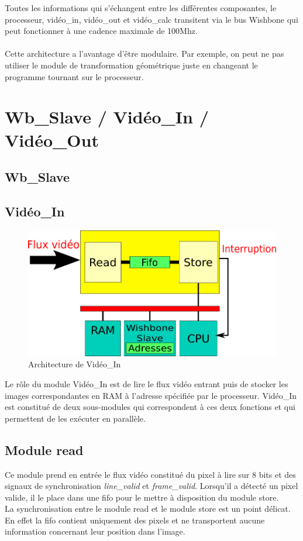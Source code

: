 \documentclass[a4paper,12pt]{report}
\begin{document}
{{{		  Toutes les informations qui s'échangent entre les différentes composantes, le processeur, vidéo\_in, vidéo\_out et vidéo\_calc transitent via le bus Wishbone qui peut fonctionner à une cadence maximale de 100Mhz.\\ \\

		  Cette architecture a l'avantage d'être modulaire. Par exemple, on peut ne pas utiliser le module de transformation géométrique juste en changeant le programme tournant sur le processeur.
	 }



	 \chapter{Wb\_Slave / Vidéo\_In / Vidéo\_Out}
	 \section{Wb\_Slave}


	 \section{Vidéo\_In}

	 \begin{figure}[!h]
		\centering
		\includegraphics[scale = 0.5]{video_in.png}
	 \caption{Architecture de Vidéo\_In}
	 \end{figure}

	 Le rôle du module Vidéo\_In est de lire le flux vidéo entrant puis de stocker les images correspondantes en RAM à l'adresse spécifiée par le processeur.
		Vidéo\_In est constitué de deux sous-modules qui correspondent à ces deux fonctions et qui permettent de les exécuter en parallèle.


		\section*{Module read}
	 Ce module prend en entrée le flux vidéo constitué du pixel à lire sur 8 bits et des signaux de synchronisation \emph{line\_valid} et \emph{frame\_valid}.
		Lorsqu'il a détecté un pixel valide, il le place dans une fifo pour le mettre à disposition du module store.\\
		La synchronisation entre le module read et le module store est un point délicat.
		En effet la fifo contient uniquement des pixels et ne transportent aucune information concernant leur position dans l'image.

}}
\end{document}
